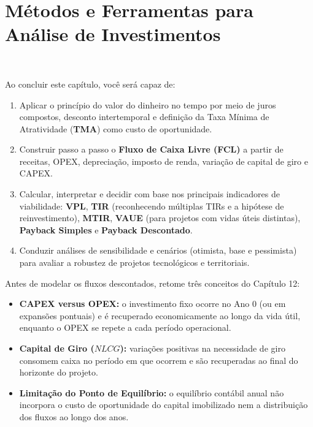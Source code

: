\chapter{Métodos e Ferramentas para Análise de Investimentos}
\label{cap:13}

\noindent{}\ \tagQuant
\vspace{6pt}

\begin{capObjetivos}
Ao concluir este capítulo, você será capaz de:
\begin{enumerate}[leftmargin=1.4em, itemsep=2pt]
  \item Aplicar o princípio do valor do dinheiro no tempo por meio de juros compostos, desconto intertemporal e definição da Taxa Mínima de Atratividade (\textbf{TMA}) como custo de oportunidade.
  \item Construir passo a passo o \textbf{Fluxo de Caixa Livre (FCL)} a partir de receitas, OPEX, depreciação, imposto de renda, variação de capital de giro e CAPEX.
  \item Calcular, interpretar e decidir com base nos principais indicadores de viabilidade: \textbf{VPL}, \textbf{TIR} (reconhecendo múltiplas TIRs e a hipótese de reinvestimento), \textbf{MTIR}, \textbf{VAUE} (para projetos com vidas úteis distintas), \textbf{Payback Simples} e \textbf{Payback Descontado}.
  \item Conduzir análises de sensibilidade e cenários (otimista, base e pessimista) para avaliar a robustez de projetos tecnológicos e territoriais.
\end{enumerate}
\end{capObjetivos}

\begin{capRevisao}
Antes de modelar os fluxos descontados, retome três conceitos do Capítulo 12:
\begin{itemize}[leftmargin=1.4em, itemsep=2pt]
  \item \textbf{CAPEX versus OPEX:} o investimento fixo ocorre no Ano $0$ (ou em expansões pontuais) e é recuperado economicamente ao longo da vida útil, enquanto o OPEX se repete a cada período operacional.
  \item \textbf{Capital de Giro ($NLCG$):} variações positivas na necessidade de giro consomem caixa no período em que ocorrem e são recuperadas ao final do horizonte do projeto.
  \item \textbf{Limitação do Ponto de Equilíbrio:} o equilíbrio contábil anual não incorpora o custo de oportunidade do capital imobilizado nem a distribuição dos fluxos ao longo dos anos.
\end{itemize}
\end{capRevisao}

